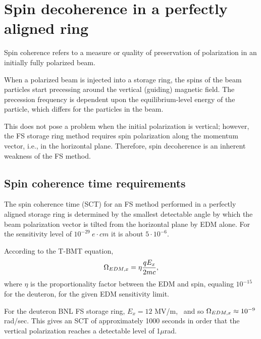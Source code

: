 \documentclass{article}
\begin{document}
\tableofcontents
\newpage

\section{Spin decoherence in a perfectly aligned ring}
Spin coherence refers to a measure or quality of preservation of polarization in an initially fully polarized beam.~\citep[p.~205]{Eremey:Thesis}

When a polarized beam is injected into a storage ring, the spins of the beam particles start precessing around the vertical (guiding) magnetic field. The precession frequency is dependent upon the equilibrium-level energy of the particle, which differs for the particles in the beam.

This does not pose a problem when the initial polarization is vertical; however, the FS storage ring method requires spin polarization along the momentum vector, i.e., in the horizontal plane. Therefore, spin decoherence is an inherent weakness of the FS method.

\subsection{Spin coherence time requirements}
The spin coherence time (SCT) for an FS method performed in a perfectly aligned storage ring is determined by the smallest detectable angle by which the beam polarization vector is tilted from the horizontal plane by EDM alone. For the sensitivity level of $10^{-29}~e\cdot cm$ it is about $5\cdot10^{-6}$.~\cite{BNL:Deuteron2008}

According to the T-BMT equation,
\[
\Omega_{EDM,x} = \eta\frac{qE_x}{2mc},
\]
where $\eta$ is the proportionality factor between the EDM and spin, equaling $10^{-15}$ for the deuteron, for the given EDM sensitivity limit.~\citep[p.~206]{Eremey:Thesis}

For the deuteron BNL FS storage ring, $E_x = 12$ MV/m,~\citep[p.~19]{BNL:Deuteron2008} and so $\Omega_{EDM,x}\approx 10^{-9}$ rad/sec. This gives an SCT of approximately 1000 seconds in order that the vertical polarization reaches a detectable level of 1$\mu$rad.~\citep[p.~207]{Eremey:Thesis}
\end{document}
